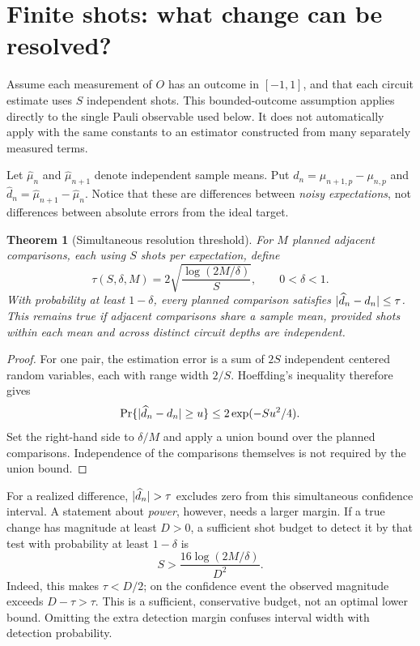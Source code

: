 \documentclass{article}
\newtheorem{theorem}{Theorem}
\DeclarePairedDelimiter{\abs}{\lvert}{\rvert}
\begin{document}
\section{Finite shots: what change can be resolved?}
Assume each measurement of $O$ has an outcome in $[-1,1]$, and that each circuit estimate uses $S$ independent shots. This bounded-outcome assumption applies directly to the single Pauli observable used below. It does not automatically apply with the same constants to an estimator constructed from many separately measured terms.

Let $\widehat\mu_n$ and $\widehat\mu_{n+1}$ denote independent sample means. Put $d_n=\mu_{n+1,p}-\mu_{n,p}$ and $\widehat d_n=\widehat\mu_{n+1}-\widehat\mu_n$. Notice that these are differences between \emph{noisy expectations}, not differences between absolute errors from the ideal target.

\begin{theorem}[Simultaneous resolution threshold]\label{thm:shots}
For $M$ planned adjacent comparisons, each using $S$ shots per expectation, define
\begin{equation}\label{eq:tau}
 \tau(S,\delta,M)=2\sqrt{\frac{\log(2 M/\delta)}{S}},
 \qquad 0<\delta<1.
\end{equation}
With probability at least $1-\delta$, every planned comparison satisfies
$\abs{\widehat d_n-d_n}\leq\tau$. This remains true if adjacent comparisons share a sample mean, provided shots within each mean and across distinct circuit depths are independent.
\end{theorem}
\begin{proof}
For one pair, the estimation error is a sum of $2 S$ independent centered random variables, each with range width $2/S$. Hoeffding's inequality \cite{hoeffding} therefore gives
\[
 \Pr\{\abs{\widehat d_n-d_n}\geq u\}
 \leq 2\exp(-Su^2/4).
\]
Set the right-hand side to $\delta/M$ and apply a union bound over the planned comparisons. Independence of the comparisons themselves is not required by the union bound.
\end{proof}
For a realized difference, $\abs{\widehat d_n}>\tau$ excludes zero from this simultaneous confidence interval. A statement about \emph{power}, however, needs a larger margin. If a true change has magnitude at least $D>0$, a sufficient shot budget to detect it by that test with probability at least $1-\delta$ is
\begin{equation}\label{eq:budget}
 S>\frac{16\log(2 M/\delta)}{D^2}.
\end{equation}
Indeed, this makes $\tau<D/2$; on the confidence event the observed magnitude exceeds $D-\tau>\tau$. This is a sufficient, conservative budget, not an optimal lower bound. Omitting the extra detection margin confuses interval width with detection probability.
\end{document}
